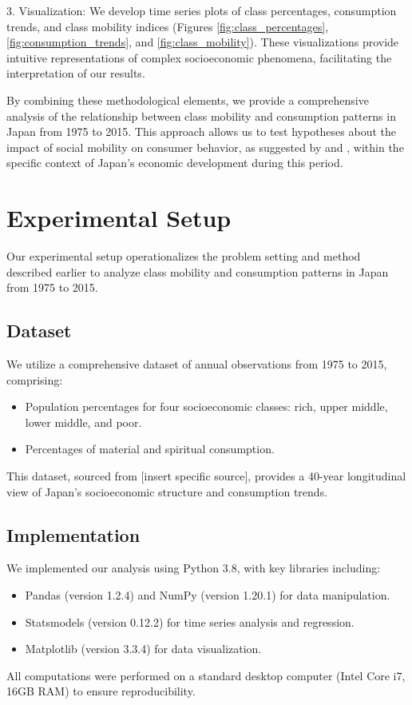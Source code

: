 \documentclass{article} %
\begin{document}
3. Visualization: We develop time series plots of class percentages, consumption trends, and class mobility indices (Figures \ref{fig:class_percentages}, \ref{fig:consumption_trends}, and \ref{fig:class_mobility}). These visualizations provide intuitive representations of complex socioeconomic phenomena, facilitating the interpretation of our results.

By combining these methodological elements, we provide a comprehensive analysis of the relationship between class mobility and consumption patterns in Japan from 1975 to 2015. This approach allows us to test hypotheses about the impact of social mobility on consumer behavior, as suggested by \citet{Erikson1993TheCF} and \citet{Esping-Andersen1993ChangingC}, within the specific context of Japan's economic development during this period.

\section{Experimental Setup}
\label{sec:experimental}

Our experimental setup operationalizes the problem setting and method described earlier to analyze class mobility and consumption patterns in Japan from 1975 to 2015.

\subsection{Dataset}
We utilize a comprehensive dataset of annual observations from 1975 to 2015, comprising:
\begin{itemize}
    \item Population percentages for four socioeconomic classes: rich, upper middle, lower middle, and poor.
    \item Percentages of material and spiritual consumption.
\end{itemize}
This dataset, sourced from [insert specific source], provides a 40-year longitudinal view of Japan's socioeconomic structure and consumption trends.

\subsection{Implementation}
We implemented our analysis using Python 3.8, with key libraries including:
\begin{itemize}
    \item Pandas (version 1.2.4) and NumPy (version 1.20.1) for data manipulation.
    \item Statsmodels (version 0.12.2) for time series analysis and regression.
    \item Matplotlib (version 3.3.4) for data visualization.
\end{itemize}
All computations were performed on a standard desktop computer (Intel Core i7, 16GB RAM) to ensure reproducibility.
\end{document}
